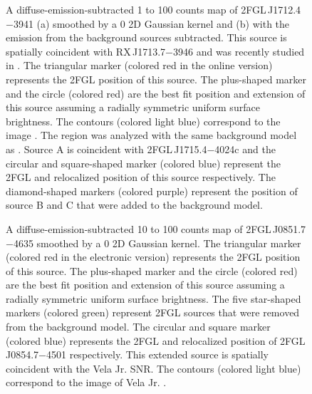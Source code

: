 \documentclass[12pt,preprint]{aastex}
\newif\ifcolorfigure
\newcommand{\gev}{\text{GeV}\xspace}
\newcommand{\tev}{\text{TeV}\xspace}
\begin{document}
\begin{figure}
    \ifcolorfigure
      \plotone{source_plots/source_RX_J1713.7-3946_color.eps}
    \else
    \fi
  \caption{A diffuse-emission-subtracted 1 \gev to 100 \gev counts map
  of 2FGL\,J1712.4$-$3941 (a) smoothed by a 0 2D
  Gaussian kernel and (b) with the emission from the background sources
  subtracted.  This source is spatially coincident with RX\,J1713.7$-$3946
  and was recently studied in \cite{rx_j1713_lat}.  The triangular marker
  (colored red in the online version) represents the 2FGL position of
  this source.  The plus-shaped marker and the circle (colored red) are
  the best fit position and extension of this source assuming a radially
  symmetric uniform surface brightness.  The contours (colored light blue)
  correspond to the \tev image \citep{rx_j1713_hess}.  The region was
  analyzed with the same background model as \cite{rx_j1713_lat}. Source
  A is coincident with 2FGL\,J1715.4$-$4024c and the circular and
  square-shaped marker (colored blue) represent the 2FGL and relocalized
  position of this source respectively.  The diamond-shaped markers
  (colored purple) represent the position of source B and C that were
  added to the background model.
  }\label{2FGL_J1712.4-3941}
\end{figure}



\begin{figure}
    \ifcolorfigure
      \plotone{source_plots/source_Vela_Jr_color.eps}
    \else
    \fi
  \caption{A diffuse-emission-subtracted 10 \gev to 100 \gev counts map of
  2FGL\,J0851.7$-$4635 smoothed by a 0 2D Gaussian
  kernel. The triangular marker (colored red in the electronic version)
  represents the 2FGL position of this source.  The plus-shaped marker
  and the circle (colored red) are the best fit position and extension of
  this source assuming a radially symmetric uniform surface brightness.
  The five star-shaped markers (colored green) represent 2FGL sources
  that were removed from the background model.  The circular and square
  marker (colored blue) represents the 2FGL and relocalized position of
  2FGL\,J0854.7$-$4501 respectively.  This extended source is spatially
  coincident with the Vela Jr. SNR.  The contours (colored light blue)
  correspond to the \tev image of Vela Jr.
  \citep{vela_jr_hess}.
  }\label{Vela_Jr}
\end{figure}
\end{document}

